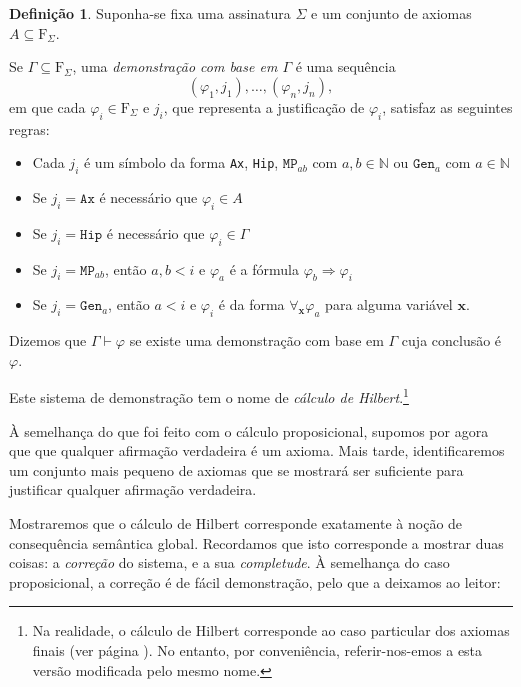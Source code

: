 \documentclass{report}
\theoremstyle{definition}
\newtheorem{definicao}{Definição}
\theoremstyle{remark}
\newcommand{\N}{\mathbb{N}}
\renewcommand{\bf}[1]{\mathbf{#1}}
\newcommand{\F}{\mathrm{F}}
\newcommand{\imply}{\mathbin{\Rightarrow}}
\begin{document}
	\begin{definicao}
	Suponha-se fixa uma assinatura $\Sigma$ e um conjunto de axiomas $A \subseteq \F_\Sigma$.
	
	Se $\Gamma \subseteq \F_\Sigma$, uma \emph{demonstração com base em $\Gamma$} é uma sequência
	\[(\varphi_1, j_1), \dots, (\varphi_n, j_n),\]
	em que cada $\varphi_i \in \F_\Sigma$ e $j_i$, que representa a justificação de $\varphi_i$, satisfaz as seguintes regras:
	
	\begin{itemize}
	\item Cada $j_i$ é um símbolo da forma \texttt{Ax}, \texttt{Hip}, $\texttt{MP}_{ab}$ com $a, b \in \N$ ou $\texttt{Gen}_a$ com $a \in \N$
	
	\item Se $j_i = \texttt{Ax}$ é necessário que $\varphi_i \in A$
	
	\item Se $j_i = \texttt{Hip}$ é necessário que $\varphi_i \in \Gamma$
	
	\item Se $j_i = \texttt{MP}_{ab}$, então $a, b < i$ e $\varphi_a$ é a fórmula $\varphi_b \imply \varphi_i$
	
	\item Se $j_i = \texttt{Gen}_a$, então $a < i$ e $\varphi_i$ é da forma $\forall_{\bf x} \varphi_a$ para alguma variável $\bf x$.
	\end{itemize}
	
	Dizemos que $\Gamma \vdash \varphi$ se existe uma demonstração com base em $\Gamma$ cuja conclusão é $\varphi$.
	
	Este sistema de demonstração tem o nome de \emph{cálculo de Hilbert}.\footnote{Na realidade, o cálculo de Hilbert corresponde ao caso particular dos axiomas finais (ver página \pageref{fol:finalaxioms}). No entanto, por conveniência, referir-nos-emos a esta versão modificada pelo mesmo nome.}
	\end{definicao}
	
	À semelhança do que foi feito com o cálculo proposicional, supomos por agora que que qualquer afirmação verdadeira é um axioma. Mais tarde, identificaremos um conjunto mais pequeno de axiomas que se mostrará ser suficiente para justificar qualquer afirmação verdadeira.
	
	Mostraremos que o cálculo de Hilbert corresponde exatamente à noção de consequência semântica global. Recordamos que isto corresponde a mostrar duas coisas: a \emph{correção} do sistema, e a sua \emph{completude}. À semelhança do caso proposicional, a correção é de fácil demonstração, pelo que a deixamos ao leitor:
	
\end{document}
